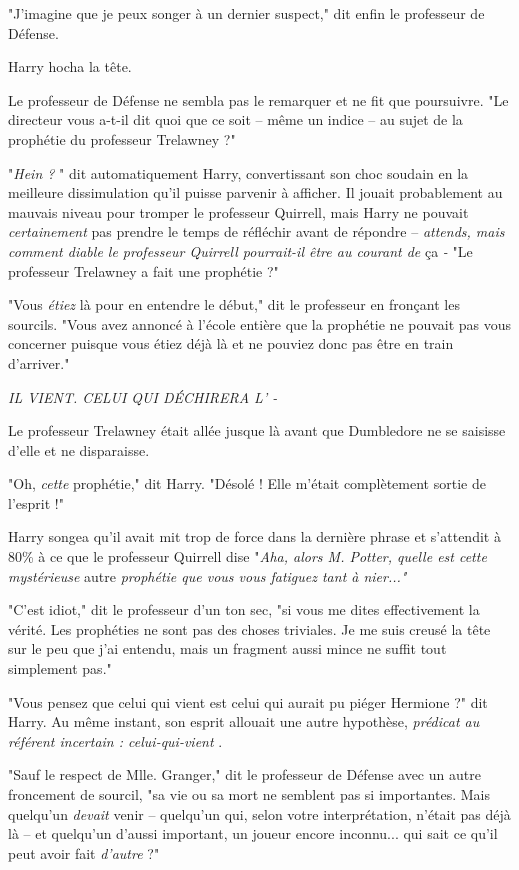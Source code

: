"J'imagine que je peux songer à un dernier suspect," dit enfin le professeur de Défense.

Harry hocha la tête.

Le professeur de Défense ne sembla pas le remarquer et ne fit que poursuivre. "Le directeur vous a-t-il dit quoi que ce soit – même un indice – au sujet de la prophétie du professeur Trelawney ?"

"\emph{Hein ?} " dit automatiquement Harry, convertissant son choc soudain en la meilleure dissimulation qu'il puisse parvenir à afficher. Il jouait probablement au mauvais niveau pour tromper le professeur Quirrell, mais Harry ne pouvait \emph{certainement}  pas prendre le temps de réfléchir avant de répondre – \emph{attends, mais comment diable le professeur Quirrell pourrait-il être au courant de } ça\emph{ - } "Le professeur Trelawney a fait une prophétie ?"

"Vous \emph{étiez}  là pour en entendre le début," dit le professeur en fronçant les sourcils. "Vous avez annoncé à l'école entière que la prophétie ne pouvait pas vous concerner puisque vous étiez déjà là et ne pouviez donc pas être en train d'arriver."

\emph{IL VIENT. CELUI QUI DÉCHIRERA L' -} 

Le professeur Trelawney était allée jusque là avant que Dumbledore ne se saisisse d'elle et ne disparaisse.

"Oh, \emph{cette}  prophétie," dit Harry. "Désolé ! Elle m'était complètement sortie de l'esprit !"

Harry songea qu'il avait mit trop de force dans la dernière phrase et s'attendit à 80\% à ce que le professeur Quirrell dise "\emph{Aha, alors M. Potter, quelle est cette mystérieuse } autre\emph{ prophétie que vous vous fatiguez tant à nier..."} 

"C'est idiot," dit le professeur d'un ton sec, "si vous me dites effectivement la vérité. Les prophéties ne sont pas des choses triviales. Je me suis creusé la tête sur le peu que j'ai entendu, mais un fragment aussi mince ne suffit tout simplement pas."

"Vous pensez que celui qui vient est celui qui aurait pu piéger Hermione ?" dit Harry. Au même instant, son esprit allouait une autre hypothèse, \emph{prédicat au référent incertain : celui-qui-vient} .

"Sauf le respect de Mlle. Granger," dit le professeur de Défense avec un autre froncement de sourcil, "sa vie ou sa mort ne semblent pas si importantes. Mais quelqu'un \emph{devait}  venir – quelqu'un qui, selon votre interprétation, n'était pas déjà là – et quelqu'un d'aussi important, un joueur encore inconnu... qui sait ce qu'il peut avoir fait \emph{d'autre}  ?"

